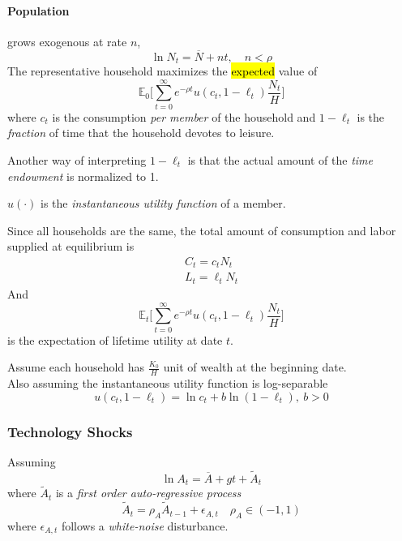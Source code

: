 \documentclass[11pt]{article}
\newcommand{\expat}[2]{\mathbb{E}_{#1}\Big[{#2}\Big]}
\begin{document}
				\paragraph{Population} grows exogenous at rate $n$,
					\begin{equation}
						\ln N_t = \overline{N} + nt,\quad n < \rho
					\end{equation}
				The representative household maximizes the \hl{expected} value of
				\begin{equation}
					\expat{0}{\sum_{t=0}^\infty e^{-\rho t} u(c_t, 1- \ell_t) \frac{N_t}{H}}
				\end{equation}
				where $c_t$ is the consumption \emph{per member} of the household and $1-\ell_t$ is the \emph{fraction} of time that the household devotes to leisure.
				\begin{remark}
					Another way of interpreting $1-\ell_t$ is that the actual amount of the \emph{time endowment} is normalized to 1.
				\end{remark}
				\par $u(\cdot)$ is the \emph{instantaneous utility function} of a member.
				\par Since all households are the same, the total amount of consumption and labor supplied at equilibrium is
				\begin{gather}
					C_t = c_t N_t \\
					L_t = \ell_t N_t
				\end{gather}
				And 
				\begin{equation}
					\expat{t}{\sum_{t=0}^\infty e^{-\rho t} u(c_t, 1- \ell_t) \frac{N_t}{H}}
				\end{equation}
				is the expectation of lifetime utility at date $t$.
				\par Assume each household has $\frac{K_0}{H}$ unit of wealth at the beginning date. \\
				Also assuming the instantaneous utility function is log-separable
				\begin{equation}
					u(c_t, 1-\ell_t) = \ln c_t + b \ln(1-\ell_t),\ b > 0
				\end{equation}
			\subsubsection{Technology Shocks}
				\par Assuming
				\begin{equation}
					\ln A_t = \overline{A} + gt + \tilde{A}_t
				\end{equation}
				where $\tilde{A}_t$ is a \emph{first order auto-regressive process}
				\begin{equation}
					\tilde{A}_t = \rho_A \tilde{A}_{t-1} + \epsilon_{A, t}\quad \rho_A \in (-1, 1)
				\end{equation}
				where $\epsilon_{A,t}$ follows a \emph{white-noise} disturbance.
			
\end{document}
